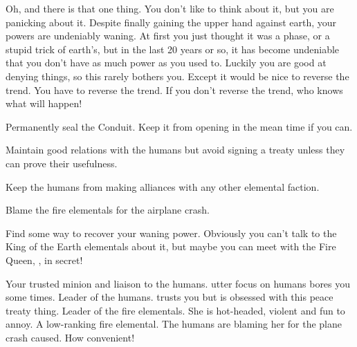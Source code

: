 \documentclass[char]{elementals}
\begin{document}
Oh, and there is that one thing. You don't like to think about it, but you are panicking about it. Despite finally gaining the upper hand against earth, your powers are undeniably waning. At first you just thought it was a phase, or a stupid trick of earth's, but in the last 20 years or so, it has become undeniable that you don't have as much power as you used to. Luckily you are good at denying things, so this rarely bothers you. Except it would be nice to reverse the trend. You have to reverse the trend. If you don't reverse the trend, who knows what will happen!   

\begin{itemz}[Goals]
	\item  Permanently seal the Conduit. Keep it from opening in the mean time if you can.
	\item  Maintain good relations with the humans but avoid signing a treaty unless they can prove their usefulness.
	\item  Keep the humans from making alliances with any other elemental faction.
	\item  Blame the fire elementals for the airplane crash.
	\item  Find some way to recover your waning power.  Obviously you can't talk to the King of the Earth elementals about it, but maybe you can meet with the Fire Queen, \cQueen{\full}, in secret!
\end{itemz}

\begin{contacts}
	\contact{\cNaturalist{\intro}} Your trusted minion and liaison to the humans. \cNaturalist{\Their} utter focus on humans bores you some times.
	\contact{\cLeader{\intro}} Leader of the humans. \cLeader{\They} trusts you but is obsessed with this peace treaty thing.
	\contact{\cQueen{\intro}} Leader of the fire elementals. She is hot-headed, violent and fun to annoy.
  \contact{\cJuliet{\intro}} A low-ranking fire elemental. The humans are blaming her for the plane crash \cNaturalist{} caused.  How convenient!
\end{contacts} 
\end{document}
